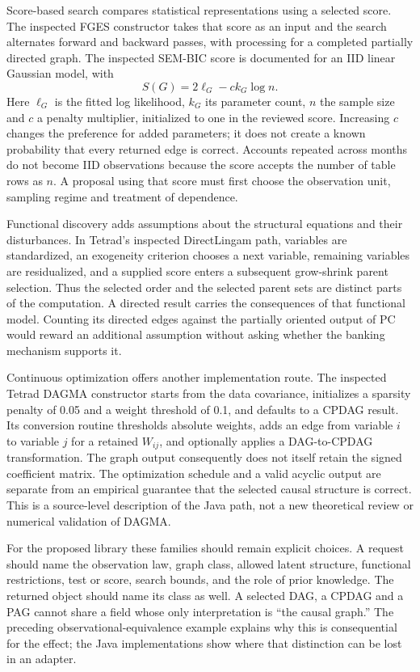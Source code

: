 Score-based search compares statistical representations using a selected
score. The inspected FGES constructor takes that score as an input and
the search alternates forward and backward passes, with processing for a
completed partially directed graph. The inspected SEM-BIC score is
documented for an IID linear Gaussian model, with \[
 S(G)=2\ell_G-c k_G\log n.
\] Here \(\ell_G\) is the fitted log likelihood, \(k_G\) its parameter
count, \(n\) the sample size and \(c\) a penalty multiplier, initialized
to one in the reviewed score. Increasing \(c\) changes the preference
for added parameters; it does not create a known probability that every
returned edge is correct. Accounts repeated across months do not become
IID observations because the score accepts the number of table rows as
\(n\). A proposal using that score must first choose the observation
unit, sampling regime and treatment of dependence.
\citep{exec13_java_tetrad}

Functional discovery adds assumptions about the structural equations and
their disturbances. In Tetrad's inspected DirectLingam path, variables
are standardized, an exogeneity criterion chooses a next variable,
remaining variables are residualized, and a supplied score enters a
subsequent grow-shrink parent selection. Thus the selected order and the
selected parent sets are distinct parts of the computation. A directed
result carries the consequences of that functional model. Counting its
directed edges against the partially oriented output of PC would reward
an additional assumption without asking whether the banking mechanism
supports it. \citep{exec13_java_tetrad}

Continuous optimization offers another implementation route. The
inspected Tetrad DAGMA constructor starts from the data covariance,
initializes a sparsity penalty of 0.05 and a weight threshold of 0.1,
and defaults to a CPDAG result. Its conversion routine thresholds
absolute weights, adds an edge from variable \(i\) to variable \(j\) for
a retained \(W_{ij}\), and optionally applies a DAG-to-CPDAG
transformation. The graph output consequently does not itself retain the
signed coefficient matrix. The optimization schedule and a valid acyclic
output are separate from an empirical guarantee that the selected causal
structure is correct. This is a source-level description of the Java
path, not a new theoretical review or numerical validation of DAGMA.
\citep{exec13_java_tetrad}

For the proposed library these families should remain explicit choices.
A request should name the observation law, graph class, allowed latent
structure, functional restrictions, test or score, search bounds, and
the role of prior knowledge. The returned object should name its class
as well. A selected DAG, a CPDAG and a PAG cannot share a field whose
only interpretation is ``the causal graph.'' The preceding
observational-equivalence example explains why this is consequential for
the effect; the Java implementations show where that distinction can be
lost in an adapter.


